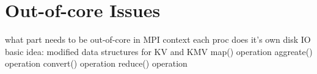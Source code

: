 \section{Out-of-core Issues}

  what part needs to be out-of-core in MPI context
  each proc does it's own disk IO
  basic idea: modified data structures for KV and KMV
  map() operation
  aggreate() operation
  convert() operation
  reduce() operation

